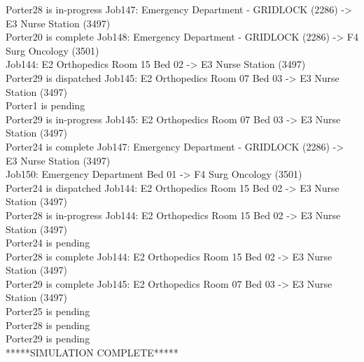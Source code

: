 \documentclass[paper=letter, fontsize=10pt]{scrartcl}
\numberwithin{equation}{section}		%
\numberwithin{figure}{section}			%
\numberwithin{table}{section}				%
\begin{document}
\begin{enumerate}[(i)]
Porter28 is in-progress Job147: Emergency Department - GRIDLOCK (2286) -> E3 Nurse Station (3497) \\
Porter20 is complete Job148: Emergency Department - GRIDLOCK (2286) -> F4 Surg Oncology (3501) \\
Job144: E2 Orthopedics Room 15 Bed 02 -> E3 Nurse Station (3497) \\
Porter29 is dispatched Job145: E2 Orthopedics Room 07 Bed 03 -> E3 Nurse Station (3497) \\
Porter1 is pending \\
Porter29 is in-progress Job145: E2 Orthopedics Room 07 Bed 03 -> E3 Nurse Station (3497)\\
Porter24 is complete Job147: Emergency Department - GRIDLOCK (2286) -> E3 Nurse Station (3497)\\
Job150: Emergency Department Bed 01 -> F4 Surg Oncology (3501)\\
Porter24 is dispatched Job144: E2 Orthopedics Room 15 Bed 02 -> E3 Nurse Station (3497)\\
Porter28 is in-progress Job144: E2 Orthopedics Room 15 Bed 02 -> E3 Nurse Station (3497)\\
Porter24 is pending\\
Porter28 is complete Job144: E2 Orthopedics Room 15 Bed 02 -> E3 Nurse Station (3497)\\
Porter29 is complete Job145: E2 Orthopedics Room 07 Bed 03 -> E3 Nurse Station (3497)\\
Porter25 is pending\\
Porter28 is pending\\
Porter29 is pending\\
*****SIMULATION COMPLETE*****\\
\end{enumerate}
\end{document}
